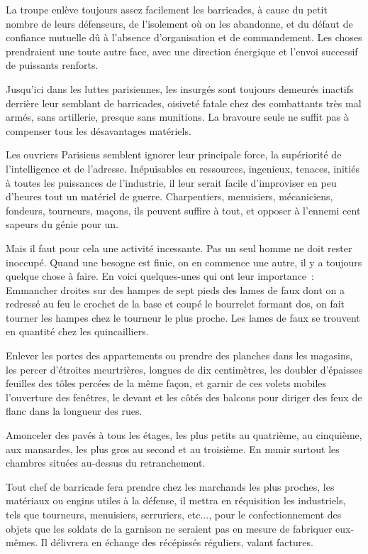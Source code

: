 \documentclass[french,twoside]{book} %
\begin{document}
La troupe enlève toujours assez facilement les barricades, à cause du petit nombre de leurs défenseurs, de l’isolement où on les abandonne, et du défaut de confiance mutuelle dû à l’absence d’organisation et de commandement. Les choses prendraient une toute autre face, avec une direction énergique et l’envoi successif de puissants renforts.\par
Jusqu’ici dans les luttes parisiennes, les insurgés sont toujours demeurés inactifs derrière leur semblant de barricades, oisiveté fatale chez des combattants très mal armés, sans artillerie, presque sans munitions. La bravoure seule ne suffit pas à compenser tous les désavantages matériels.\par
Les ouvriers Parisiens semblent ignorer leur principale force, la supériorité de l’intelligence et de l’adresse. Inépuisables en ressources, ingenieux, tenaces, initiés à toutes les puissances de l’industrie, il leur serait facile d’improviser en peu d’heures tout un matériel de guerre. Charpentiers, menuisiers, mécaniciens, fondeurs, tourneurs, maçons, ils peuvent suffire à tout, et opposer à l’ennemi cent sapeurs du génie pour un.\par
Mais il faut pour cela une activité incessante. Pas un seul homme ne doit rester inoccupé. Quand une besogne est finie, on en commence une autre, il y a toujours quelque chose à faire. En voici quelques-unes qui ont leur importance : Emmancher droites sur des hampes de sept pieds des lames de faux dont on a redressé au feu le crochet de la base et coupé le bourrelet formant dos, on fait tourner les hampes chez le tourneur le plus proche. Les lames de faux se trouvent en quantité chez les quincailliers.\par
Enlever les portes des appartements ou prendre des planches dans les magasins, les percer d’étroites meurtrières, longues de dix centimètres, les doubler d’épaisses feuilles des tôles percées de la même façon, et garnir de ces volets mobiles l’ouverture des fenêtres, le devant et les côtés des balcons pour diriger des feux de flanc dans la longueur des rues.\par
Amonceler des pavés à tous les étages, les plus petits au quatrième, au cinquième, aux mansardes, les plus gros au second et au troisième. En munir surtout les chambres situées au-dessus du retranchement.\par
Tout chef de barricade fera prendre chez les marchands les plus proches, les matériaux ou engins utiles à la défense, il mettra en réquisition les industriels, tels que tourneurs, menuisiers, serruriers, etc..., pour le confectionnement des objets que les soldats de la garnison ne seraient pas en mesure de fabriquer eux-mêmes. Il délivrera en échange des récépissés réguliers, valant factures.\par
\end{document}
